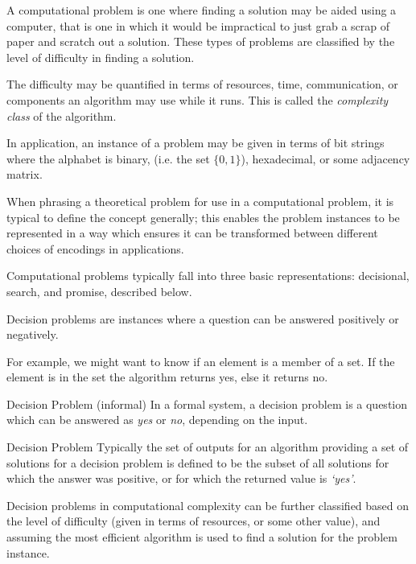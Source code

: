 A computational problem is one where finding a solution may be aided using a computer, that is one in which it would be impractical to just grab a scrap of paper and scratch out a solution. These types of problems are classified by the level of difficulty in finding a solution. 
    

The difficulty may be quantified in terms of resources, time, communication, or components an algorithm may use while it runs. This is called the \emph{complexity class} of the algorithm.


In application, an instance of a problem may be given in terms of bit strings where the alphabet is binary, (i.e. the set $\{0,1\}$), hexadecimal, or some adjacency matrix. 

When phrasing a theoretical problem for use in a computational problem, it is typical to define the concept generally; this enables the problem instances to be represented in a way which ensures it can be transformed between different choices of encodings in applications. 
    
    
Computational problems typically fall into three basic representations: decisional, search, and promise, described below.


       
Decision problems are instances where a question can be answered positively or negatively. 

For example, we might want to know if an element is a member of a set. If the element is in the set the algorithm returns yes, else it returns no.


\begin{defn}{Decision Problem (informal)}
    In a formal system, a decision problem is a question which can be answered as \emph{yes} or \emph{no}, depending on the input.
\end{defn}



\begin{defn}{Decision Problem}
    Typically the set of outputs for an algorithm providing a set of solutions for a decision problem is defined to be the subset of all solutions for which the answer was positive, or for which the returned value is \emph{`yes'}.
\end{defn}



Decision problems in computational complexity can be further classified based on the level of difficulty (given in terms of resources, or some other value), and assuming the most efficient algorithm is used to find a solution for the problem instance. 



